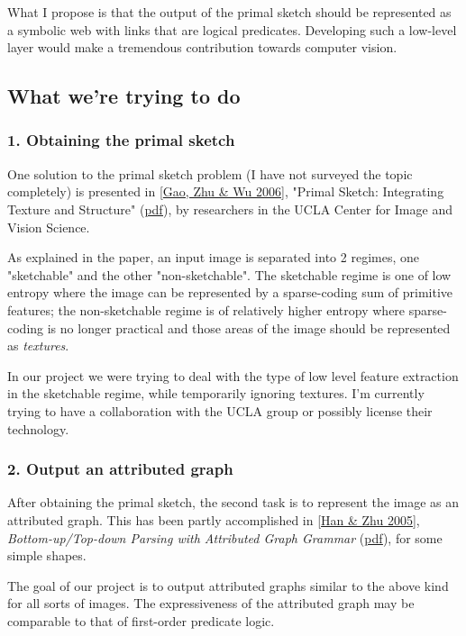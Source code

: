 What I propose is that the output of the primal sketch should be represented as a symbolic web with links that are logical predicates. Developing such a low-level layer would make a tremendous contribution towards computer vision.

\subsection{What we're trying to do }

\subsubsection{1. Obtaining the primal sketch }

One solution to the primal sketch problem (I have not surveyed the topic completely) is presented in [\hyperlink{Ref}{Gao, Zhu \& Wu 2006}], "Primal Sketch: Integrating Texture and Structure" (\href{http://www.stat.ucla.edu/~sczhu/papers/primal_sketch.pdf}{pdf}), by researchers in the UCLA Center for Image and Vision Science.

As explained in the paper, an input image is separated into 2 regimes, one "sketchable" and the other "non-sketchable". The sketchable regime is one of low entropy where the image can be represented by a sparse-coding sum of primitive features; the non-sketchable regime is of relatively higher entropy where sparse-coding is no longer practical and those areas of the image should be represented as \emph{textures}.

In our project we were trying to deal with the type of low level feature extraction in the sketchable regime, while temporarily ignoring textures. I'm currently trying to have a collaboration with the UCLA group or possibly license their technology.

\subsubsection{2. Output an attributed graph}

After obtaining the primal sketch, the second task is to represent the image as an attributed graph. This has been partly accomplished in [\hyperlink{Ref}{Han \& Zhu 2005}], \emph{Bottom-up/Top-down Parsing with Attributed Graph Grammar} (\href{http://www.stat.ucla.edu/~sczhu/papers/PAMI_Grammar_rectangle.pdf}{pdf}), for some simple shapes.

The goal of our project is to output attributed graphs similar to the above kind for all sorts of images. The expressiveness of the attributed graph may be comparable to that of first-order predicate logic.

